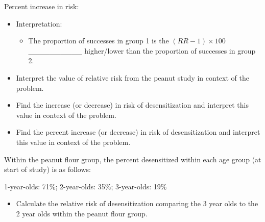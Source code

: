 \documentclass[
]{report}
\providecommand{\tightlist}{%
  \setlength{\itemsep}{0pt}\setlength{\parskip}{0pt}}
\begin{document}
Percent increase in risk:

\vspace{0.3in}

\begin{itemize}
\item
  Interpretation:

  \begin{itemize}
  \tightlist
  \item
    The proportion of successes in group 1 is the \((RR-1)\times 100\) \_\_\_\_\_\_\_\_\_\_ higher/lower than the proportion of successes in group 2.
  \end{itemize}
\end{itemize}


\begin{itemize}
\tightlist
\item
  Interpret the value of relative risk from the peanut study in context of the problem.
\end{itemize}

\vspace{0.6in}

\begin{itemize}
\tightlist
\item
  Find the increase (or decrease) in risk of desensitization and interpret this value in context of the problem.
\end{itemize}

\vspace{1in}

\begin{itemize}
\tightlist
\item
  Find the percent increase (or decrease) in risk of desensitization and interpret this value in context of the problem.
\end{itemize}

\vspace{1in}

Within the peanut flour group, the percent desensitized within each age group (at start of study) is as follows:

1-year-olds: 71\%; 2-year-olds: 35\%; 3-year-olds: 19\%

\begin{itemize}
\tightlist
\item
  Calculate the relative risk of desensitization comparing the 3 year olds to the 2 year olds within the peanut flour group.
\end{itemize}
\end{document}
